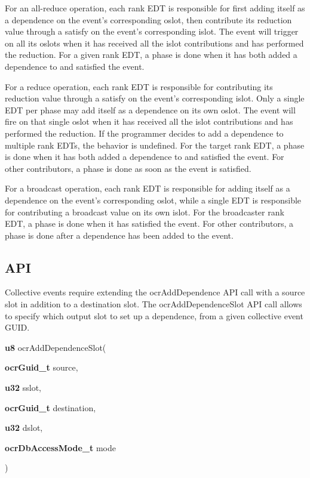 For an all-reduce operation, each rank EDT is responsible for first adding itself
as a dependence on the event's corresponding oslot, then contribute its reduction
value through a satisfy on the event's corresponding islot. The event will
trigger on all its oslots when it has received all the islot contributions
and has performed the reduction. For a given rank EDT, a phase is done
when it has both added a dependence to and satisfied the event.

For a reduce operation, each rank EDT is responsible for contributing its
reduction value through a satisfy on the event's corresponding islot. Only a
single EDT per phase may add itself as a dependence on its own oslot. The event
will fire on that single oslot when it has received all the islot contributions
and has performed the reduction. If the programmer decides to add a dependence
to multiple rank EDTs, the behavior is undefined. For the target rank EDT, a phase
is done when it has both added a dependence to and satisfied the event. For
other contributors, a phase is done as soon as the event is satisfied.

For a broadcast operation, each rank EDT is responsible for adding itself
as a dependence on the event's corresponding oslot, while a single EDT is
responsible for contributing a broadcast value on its own islot. For the
broadcaster rank EDT, a phase is done when it has satisfied the event.
For other contributors, a phase is done after a dependence has been added to the event.

\subsection{API}

Collective events require extending the ocrAddDependence API call with a source slot
in addition to a destination slot. The ocrAddDependenceSlot API call allows to specify which output slot
to set up a dependence, from a given collective event GUID.

 {\bf u8} ocr\-Add\-DependenceSlot(
\begin{DoxyParamCaption}
\item[{{\bf ocr\-Guid\-\_\-t}}]{source, }
\item[{{\bf u32}}]{sslot, }
\item[{{\bf ocr\-Guid\-\_\-t}}]{destination, }
\item[{{\bf u32}}]{dslot, }
\item[{{\bf ocr\-Db\-Access\-Mode\-\_\-t}}]{mode}
\end{DoxyParamCaption}
)

